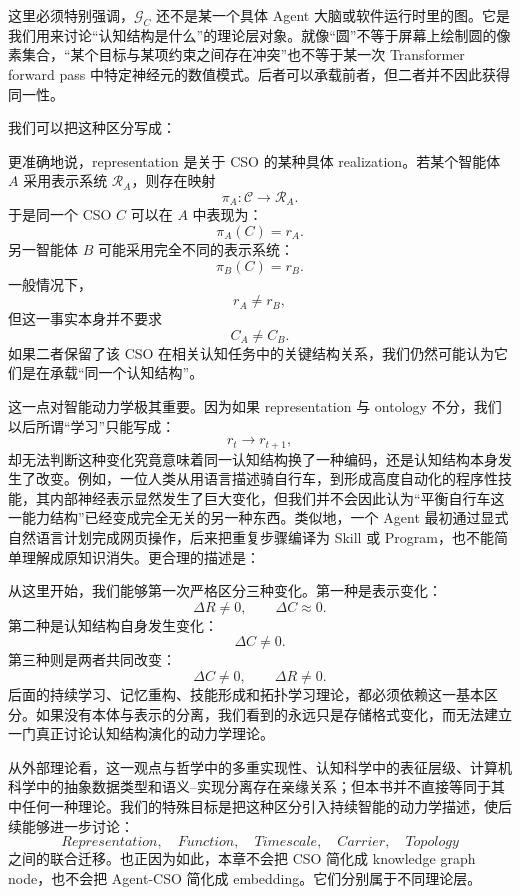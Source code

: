 这里必须特别强调，$\mathcal G_C$ 还不是某一个具体 Agent 大脑或软件运行时里的图。它是我们用来讨论“认知结构是什么”的理论层对象。就像“圆”不等于屏幕上绘制圆的像素集合，“某个目标与某项约束之间存在冲突”也不等于某一次 Transformer forward pass 中特定神经元的数值模式。后者可以承载前者，但二者并不因此获得同一性。

我们可以把这种区分写成：
\begin{statementbox}
\centering
{}
\end{statementbox}
更准确地说，representation 是关于 CSO 的某种具体 realization。若某个智能体 $A$ 采用表示系统 $\mathcal R_A$，则存在映射
\[
\pi_A:
\mathcal C
\rightarrow
\mathcal R_A.
\]
于是同一个 CSO $C$ 可以在 $A$ 中表现为：
\[
\pi_A(C)=r_A.
\]
另一智能体 $B$ 可能采用完全不同的表示系统：
\[
\pi_B(C)=r_B.
\]
一般情况下，
\[
r_A\neq r_B,
\]
但这一事实本身并不要求
\[
C_A\neq C_B.
\]
如果二者保留了该 CSO 在相关认知任务中的关键结构关系，我们仍然可能认为它们是在承载“同一个认知结构”。

这一点对智能动力学极其重要。因为如果 representation 与 ontology 不分，我们以后所谓“学习”只能写成：
\[
r_t\rightarrow r_{t+1},
\]
却无法判断这种变化究竟意味着同一认知结构换了一种编码，还是认知结构本身发生了改变。例如，一位人类从用语言描述骑自行车，到形成高度自动化的程序性技能，其内部神经表示显然发生了巨大变化，但我们并不会因此认为“平衡自行车这一能力结构”已经变成完全无关的另一种东西。类似地，一个 Agent 最初通过显式自然语言计划完成网页操作，后来把重复步骤编译为 Skill 或 Program，也不能简单理解成原知识消失。更合理的描述是：
\begin{statementbox}
\centering
{}
\end{statementbox}

从这里开始，我们能够第一次严格区分三种变化。第一种是表示变化：
\[
\Delta R\neq0,
\qquad
\Delta C\approx0.
\]
第二种是认知结构自身发生变化：
\[
\Delta C\neq0.
\]
第三种则是两者共同改变：
\[
\Delta C\neq0,
\qquad
\Delta R\neq0.
\]
后面的持续学习、记忆重构、技能形成和拓扑学习理论，都必须依赖这一基本区分。如果没有本体与表示的分离，我们看到的永远只是存储格式变化，而无法建立一门真正讨论认知结构演化的动力学理论。

从外部理论看，这一观点与哲学中的多重实现性、认知科学中的表征层级、计算机科学中的抽象数据类型和语义--实现分离存在亲缘关系；但本书并不直接等同于其中任何一种理论。我们的特殊目标是把这种区分引入持续智能的动力学描述，使后续能够进一步讨论：
\[
Representation,
\quad
Function,
\quad
Timescale,
\quad
Carrier,
\quad
Topology
\]
之间的联合迁移。也正因为如此，本章不会把 CSO 简化成 knowledge graph node，也不会把 Agent-CSO 简化成 embedding。它们分别属于不同理论层。

